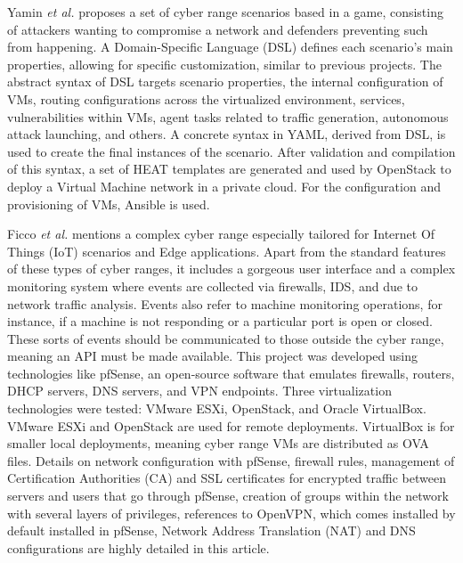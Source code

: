 Yamin \textit{et al.} \cite{serious_games_as_a_tool_to_model_attack_and_defense_scenarios_ref} proposes a set of cyber range scenarios based in a game, consisting of attackers wanting to compromise a network and defenders preventing such from happening. A Domain-Specific Language (DSL) defines each scenario's main properties, allowing for specific customization, similar to previous projects. The abstract syntax of DSL targets scenario properties, the internal configuration of VMs, routing configurations across the virtualized environment, services, vulnerabilities within VMs, agent tasks related to traffic generation, autonomous attack launching, and others. A concrete syntax in YAML, derived from DSL, is used to create the final instances of the scenario. After validation and compilation of this syntax, a set of HEAT templates are generated and used by OpenStack to deploy a Virtual Machine network in a private cloud. For the configuration and provisioning of VMs, Ansible is used.


Ficco \textit{et al.} \cite{leaf_ref} mentions a complex cyber range especially tailored for Internet Of Things (IoT) scenarios and Edge applications. Apart from the standard features of these types of cyber ranges, it includes a gorgeous user interface and a complex monitoring system where events are collected via firewalls, IDS, and due to network traffic analysis. Events also refer to machine monitoring operations, for instance, if a machine is not responding or a particular port is open or closed. These sorts of events should be communicated to those outside the cyber range, meaning an API must be made available. This project was developed using technologies like pfSense, an open-source software that emulates firewalls, routers, DHCP servers, DNS servers, and VPN endpoints. Three virtualization technologies were tested: VMware ESXi, OpenStack, and Oracle VirtualBox. VMware ESXi and OpenStack are used for remote deployments. VirtualBox is for smaller local deployments, meaning cyber range VMs are distributed as OVA files. Details on network configuration with pfSense, firewall rules, management of Certification Authorities (CA) and SSL certificates for encrypted traffic between servers and users that go through pfSense, creation of groups within the network with several layers of privileges, references to OpenVPN, which comes installed by default installed in pfSense, Network Address Translation (NAT) and DNS configurations are highly detailed in this article.

